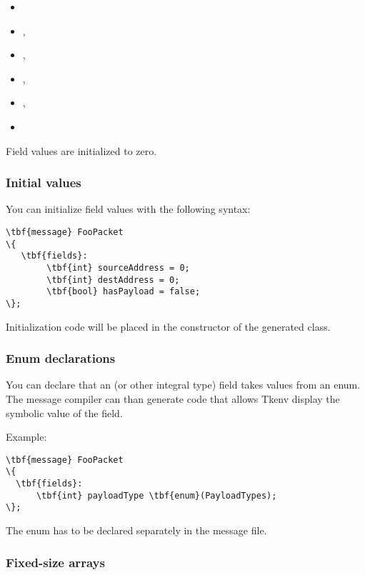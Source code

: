 \begin{itemize}
   \item {}
   \item {}, 
   \item {}, 
   \item {}, 
   \item {}, 
   \item {}
\end{itemize}

Field values are initialized to zero.


\subsubsection{Initial values}

You can initialize field values with the following syntax:

\begin{Verbatim}[commandchars=\\\{\}]
\tbf{message} FooPacket
\{
   \tbf{fields}:
        \tbf{int} sourceAddress = 0;
        \tbf{int} destAddress = 0;
        \tbf{bool} hasPayload = false;
\};
\end{Verbatim}

Initialization code will be placed in the constructor of the generated class.


\subsubsection{Enum declarations}

You can declare that an  (or other integral type) field
takes values from an enum. The message compiler can than generate code
that allows Tkenv display the symbolic value of the field.

Example:

\begin{Verbatim}[commandchars=\\\{\}]
\tbf{message} FooPacket
\{
  \tbf{fields}:
      \tbf{int} payloadType \tbf{enum}(PayloadTypes);
\};
\end{Verbatim}

The enum has to be declared separately in the message file.


\subsubsection{Fixed-size arrays}


